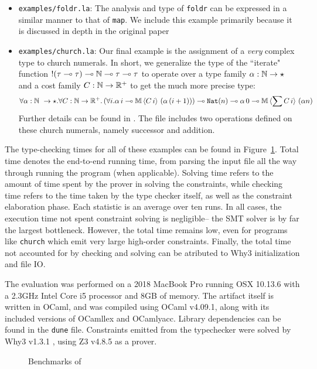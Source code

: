 \begin{itemize}
  \item \texttt{examples/foldr.la}: The analysis and type of \texttt{foldr} can be expressed in a similar manner to that of \texttt{map}. We include this example primarily because it is discussed in depth in the original \lambdaamor paper \cite{rajani-et-al:popl21}
  \item \texttt{examples/church.la}: Our final example is the assignment of a \textit{very} complex type to church numerals. In short, we generalize the type of the ``iterate" function $!(\tau \multimap \tau) \multimap \mathbb{N} \multimap \tau \multimap \tau$ to operate over a type family $\alpha : \mathbb{N} \to \star$ and a cost family $C : \mathbb{N} \to \mathbb{R}^+$ to get the much more precise type:
  $$
   \forall \alpha : \mathbb{N} \ \to \star. \forall C : \mathbb{N} \to \mathbb{R}^+. \left(\forall i. \alpha \, i \multimap \mathbb{M} \, \langle C \, i \rangle \, \left(\alpha \, (i+1)\right)\right) \multimap \texttt{Nat}(n) \multimap \alpha \, 0 \multimap \mathbb{M} \, \langle \sum C\, i\rangle \, \left(\alpha n\right)
  $$
  Further details can be found in \citet{rajani-et-al:popl21}. The file includes two operations defined on these church numerals, namely successor and addition.
\end{itemize}

The type-checking times for all of these examples can be found in Figure~\ref{fig:lambdaamorimpl-eval}. Total time denotes the end-to-end running time, from parsing the input file all the way through running the program (when applicable). Solving time refers to the amount of time spent by the prover in solving the constraints, while checking time refers to the time taken by the type checker itself, as well as the constraint elaboration phase. Each statistic is an average over ten runs. In all cases, the execution time not spent constraint solving is negligible-- the SMT solver is by far the largest bottleneck. However, the total time remains low, even for programs like \texttt{church} which emit very large high-order constraints. Finally, the total time not accounted for by checking and solving can be atributed to Why3 initialization and file IO. 

The evaluation was performed on a 2018 MacBook Pro running OSX 10.13.6 with a 2.3GHz Intel Core i5 processor and 8GB of memory. The artifact itself is written in OCaml, and was compiled using OCaml v4.09.1, along with its included versions of OCamllex and OCamlyacc. Library dependencies can be found in the \texttt{dune} file. Constraints emitted from the typechecker were solved by Why3 v1.3.1 \citehere, using Z3 v4.8.5 \citehere as a prover.

\begin{figure}

\caption{Benchmarks of \lambdaamorimpl}
\label{fig:lambdaamorimpl-eval}
\end{figure}